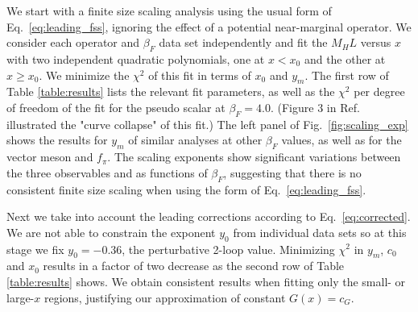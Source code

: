 \documentclass[aps,prl,twocolumn,]{revtex4}  %
\newcommand{\refcite}[1]{Ref.~\cite{#1}}
\newcommand{\eq}[1]{Eq.~\ref{#1}}
\newcommand{\fig}[1]{Fig.~\ref{#1}}
\begin{document}
We start with a finite size scaling analysis  using the usual form of \eq{eq:leading_fss}, ignoring the effect of a potential near-marginal operator. We consider each operator and $\beta_F$ data set independently and fit the $M_H L$ versus $x$ with two independent quadratic polynomials, one at $x<x_0$ and the other at $x\ge x_0$. We minimize the $\chi^2$ of this fit in terms of $x_0$ and $y_m$.
The first row of  Table \ref{table:results} lists the relevant fit parameters, as well as the $\chi^2$ per degree of freedom of the fit for the pseudo scalar at $\beta_F=4.0$. (Figure 3 in \refcite{Hasenfratz:2013eka} illustrated the "curve collapse" of this fit.) 
The left panel of \fig{fig:scaling_exp} shows the results for $y_m$ of similar analyses at other $\beta_F$ values, as well as for the vector meson and $f_\pi$.
The scaling exponents show significant variations between the three observables and as functions of $\beta_F$, suggesting that there is no consistent finite size scaling when using the form of \eq{eq:leading_fss}.

Next we take into account the leading corrections according to \eq{eq:corrected}. We are not able to constrain  the exponent $y_0$ from individual data sets so at this stage we fix $y_0=-0.36$, the perturbative  2-loop value. Minimizing $\chi^2$ in $y_m$, $c_0$ and $x_0$ results in a factor of two decrease as the second row of Table \ref{table:results} shows. We obtain consistent results when fitting only the small- or large-$x$ regions, justifying our approximation of constant $G(x) = c_G$. %
\end{document}
